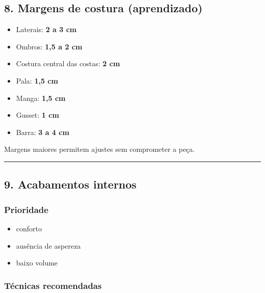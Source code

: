 \documentclass[
  10pt,oneside]{article}
\providecommand{\tightlist}{%
  \setlength{\itemsep}{0pt}\setlength{\parskip}{0pt}}
\begin{document}
\subsection{8. Margens de costura (aprendizado)}\label{margens-de-costura-aprendizado}

\begin{itemize}
\tightlist
\item
  Laterais: \textbf{2 a 3 cm}
\item
  Ombros: \textbf{1,5 a 2 cm}
\item
  Costura central das costas: \textbf{2 cm}
\item
  Pala: \textbf{1,5 cm}
\item
  Manga: \textbf{1,5 cm}
\item
  Gusset: \textbf{1 cm}
\item
  Barra: \textbf{3 a 4 cm}
\end{itemize}

Margens maiores permitem ajustes sem comprometer a peça.

\begin{center}\rule{0.5\linewidth}{0.5pt}\end{center}

\subsection{9. Acabamentos internos}\label{acabamentos-internos}

\subsubsection{Prioridade}\label{prioridade}

\begin{itemize}
\tightlist
\item
  conforto
\item
  ausência de aspereza
\item
  baixo volume
\end{itemize}

\subsubsection{Técnicas recomendadas}\label{tuxe9cnicas-recomendadas}
\end{document}
